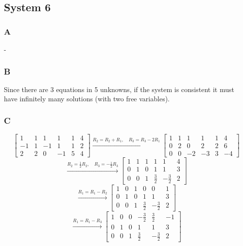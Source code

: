 \documentclass{article}
\begin{document}
\subsection*{System 6}

\subsubsection*{A}

-

\subsubsection*{B}

Since there are 3 equations in 5 unknowns, if the system is consistent it must have infinitely many solutions (with two free variables).

\subsubsection*{C}

\[
	\begin{bmatrix}
		1  & 1 & 1  & 1  & 1 & 4 \\
		-1 & 1 & -1 & 1  & 1 & 2 \\
		2  & 2 & 0  & -1 & 5 & 4
	\end{bmatrix}
	\xrightarrow{R_2 = R_2 + R_1,\quad R_3 = R_3 - 2R_1}
	\begin{bmatrix}
		1 & 1 & 1  & 1  & 1 & 4  \\
		0 & 2 & 0  & 2  & 2 & 6  \\
		0 & 0 & -2 & -3 & 3 & -4
	\end{bmatrix}
\]
\[
	\xrightarrow{R_2 = \frac{1}{2}R_2,\quad R_3 = -\frac{1}{2}R_3}
	\begin{bmatrix}
		1 & 1 & 1 & 1           & 1            & 4 \\
		0 & 1 & 0 & 1           & 1            & 3 \\
		0 & 0 & 1 & \frac{3}{2} & -\frac{3}{2} & 2
	\end{bmatrix}
\]
\[
	\xrightarrow{R_1 = R_1 - R_2}
	\begin{bmatrix}
		1 & 0 & 1 & 0           & 0            & 1 \\
		0 & 1 & 0 & 1           & 1            & 3 \\
		0 & 0 & 1 & \frac{3}{2} & -\frac{3}{2} & 2
	\end{bmatrix}
\]
\[
	\xrightarrow{R_1 = R_1 - R_3}
	\begin{bmatrix}
		1 & 0 & 0 & -\frac{3}{2} & \frac{3}{2}  & -1 \\
		0 & 1 & 0 & 1            & 1            & 3  \\
		0 & 0 & 1 & \frac{3}{2}  & -\frac{3}{2} & 2
	\end{bmatrix}
\]
\end{document}

